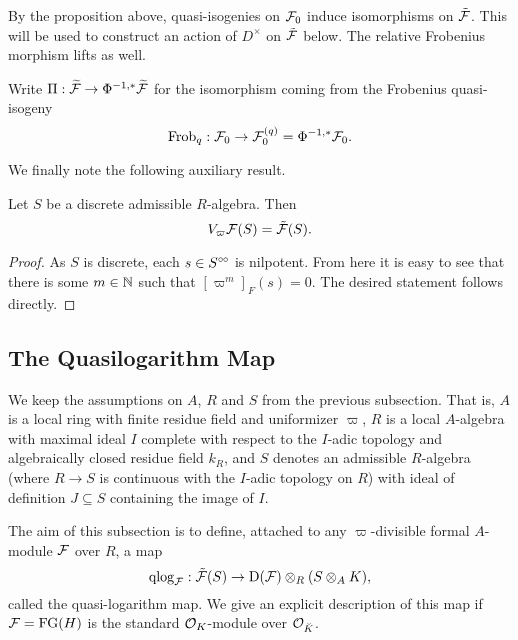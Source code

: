 \documentclass[../main.tex]{subfiles}
\begin{document}
By the proposition above, quasi-isogenies on $\mathcal{F}_0$ induce isomorphisms on 
$\tilde {\mathcal{F}}$. This will be used to construct an action of $D^\times$ on 
$\tilde {\mathcal{F}}$ below. 
The relative Frobenius morphism lifts as well.
\begin{defi} \label{def:FrobOnUnivCov}
  Write $\Pi: \widetilde{\mathcal{F}} \to \Phi^{-1,*}\widetilde{\mathcal{F}}$ for the isomorphism coming from
  the Frobenius quasi-isogeny 
  \begin{equation*}
    \mathrm{Frob}_q: \mathcal{F}_0 \to \mathcal{F}_0^{(q)} = \Phi^{-1,*} \mathcal{F}_0.
  \end{equation*}
\end{defi}

We finally note the following auxiliary result.
\begin{lem}\label{lem:UnivCoverIsRatTateifDiscrete}
  Let $S$ be a discrete admissible $R$-algebra. Then
  \begin{equation*}
    V_\varpi \mathcal{F}(S) = \tilde {\mathcal{F}}(S).
  \end{equation*}
\begin{proof}
  As $S$ is discrete, each $s \in S^{\circ \hspace{-0.5pt} \circ}$ is nilpotent. From here it is easy to 
  see that there is some $m \in \mathbb{N}$ such that $[\varpi^m]_F(s) = 0$. The desired 
  statement follows directly.
\end{proof}
\end{lem}

\subsection{The Quasilogarithm Map} %
\label{sub:The Quasilogarithm map}
We keep the assumptions on $A$, $R$ and $S$ from the previous subsection. That is,
$A$ is a local ring with finite residue field and uniformizer $\varpi$, 
$R$ is a local $A$-algebra with maximal ideal $I$ complete with respect to
the $I$-adic topology and algebraically closed residue field $k_R$, and 
$S$ denotes an admissible $R$-algebra (where $R \to S$ is continuous with
the $I$-adic topology on $R$) with ideal of definition $J \subseteq S$ containing
the image of $I$. 

The aim of this subsection is to define, attached to any $\varpi$-divisible formal
$A$-module $\mathcal{F}$ over $R$, a map
\begin{equation*}
\mathrm{qlog}_{\mathcal{F}}: \tilde {\mathcal{F}}(S) \to \mathrm{D}(\mathcal{F}) \otimes_R (S \otimes_A K),
\end{equation*}
called the quasi-logarithm map.
We give an explicit description of this map if $\mathcal{F} = \textnormal{FG}(H)$ is the standard
$\mathcal{O}_K$-module over $\mathcal{O}_{\breve K}$. 
\end{document}
